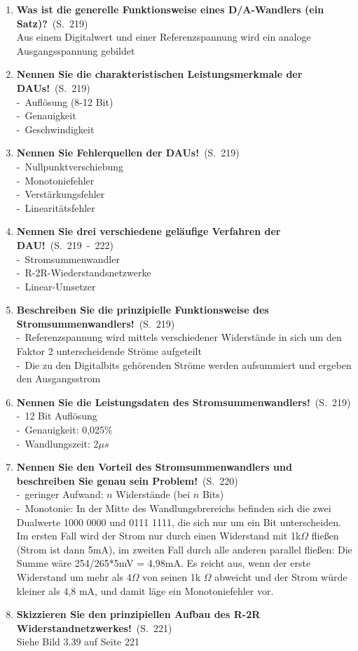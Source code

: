 \documentclass[a4paper,12pt]{article}
\newcommand{\question}[3]{\pagebreak[3]\item {\textbf{#1?}}\ (S.\ #2)#3}
\newcommand{\statement}[3]{\pagebreak[3]\item {\textbf{#1!}}\ (S.\ #2)#3}
\newcommand{\catchword}[1]{\\-\ #1}
\newcommand{\normaltext}[1]{\\#1}
\newcommand{\page}[1]{#1}
\newcommand{\pages}[2]{#1\ -\ #2}
\newcommand{\view}[2]{\index{Skizze}Siehe Bild #1 auf Seite #2}
\begin{document}
\begin{enumerate}
  \question{Was ist die generelle Funktionsweise eines D/A-Wandlers (ein Satz)}{\page{219}}
  {
    \normaltext{Aus einem Digitalwert und einer Referenzspannung wird ein analoge Ausgangsspannung gebildet}
  }

  \statement{Nennen Sie die charakteristischen Leistungsmerkmale der DAUs}{\page{219}}
  {
    \catchword{Auflösung (8-12 Bit)}
    \catchword{Genauigkeit}
    \catchword{Geschwindigkeit}
  }

  \statement{Nennen Sie Fehlerquellen der DAUs}{\page{219}}
  {
    \catchword{Nullpunktverschiebung}
    \catchword{Monotoniefehler}
    \catchword{Verstärkungsfehler}
    \catchword{Linearitätsfehler}
  }

  \statement{Nennen Sie drei verschiedene geläufige Verfahren der DAU}{\pages{219}{222}}
  {
    \catchword{Stromsummenwandler}
    \catchword{R-2R-Wiederstandsnetzwerke}
    \catchword{Linear-Umsetzer}
  }

  \statement{Beschreiben Sie die prinzipielle Funktionsweise des Stromsummenwandlers}{\page{219}}
  {
    \catchword{Referenzspannung wird mittels verschiedener Widerstände in sich um den Faktor 2
               unterscheidende Ströme aufgeteilt}
    \catchword{Die zu den Digitalbits gehörenden Ströme werden aufsummiert und ergeben den Ausgangsstrom}
  }

  \statement{Nennen Sie die Leistungsdaten des Stromsummenwandlers}{\page{219}}
  {
    \catchword{12 Bit Auflösung}
    \catchword{Genauigkeit: 0,025\%}
    \catchword{Wandlungszeit: 2$\mu s$}
  }

  \statement{Nennen Sie den Vorteil des Stromsummenwandlers und beschreiben Sie
             genau sein Problem}{\page{220}}
  {
    \catchword{geringer Aufwand: $n$ Widerstände (bei $n$ Bits)}
    \catchword{Monotonie: In der Mitte des Wandlungsbrereichs befinden sich die zwei Dualwerte 1000 0000
               und 0111 1111, die sich nur um ein Bit unterscheiden. Im ersten Fall wird der Strom nur
               durch einen Widerstand mit 1k$\Omega$ fließen (Strom ist dann 5mA), im zweiten Fall
               durch alle anderen parallel fließen: Die Summe wäre 254/265*5mV = 4,98mA. Es reicht aus,
               wenn der erste Widerstand um mehr als 4$\Omega$ von seinen 1k $\Omega$ abweicht und der
               Strom würde kleiner als 4,8 mA, und damit läge ein Monotoniefehler vor.}
  }

  \statement{Skizzieren Sie den prinzipiellen Aufbau des R-2R Widerstandnetzwerkes}{\page{221}}
  {
    \normaltext{\view{3.39}{221}}
  }


\end{enumerate}
\end{document}
